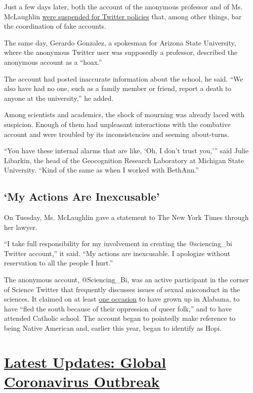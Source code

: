Just a few days later, both the account of the anonymous professor and
of Ms. McLaughlin
\href{https://www.buzzfeednews.com/article/peteraldhous/bethann-mclaughlin-twitter-suspension-fake-covid-death}{were
suspended for Twitter policies} that, among other things, bar the
coordination of fake accounts.

The same day, Gerardo Gonzalez, a spokesman for Arizona State
University, where the anonymous Twitter user was supposedly a professor,
described the anonymous account as a ``hoax.''

The account had posted inaccurate information about the school, he said.
``We also have had no one, such as a family member or friend, report a
death to anyone at the university,'' he added.

Among scientists and academics, the shock of mourning was already laced
with suspicion. Enough of them had unpleasant interactions with the
combative account and were troubled by its inconsistencies and seeming
about-turns.

``You have these internal alarms that are like, `Oh, I don't trust
you,''' said Julie Libarkin, the head of the Geocognition Research
Laboratory at Michigan State University. ``Kind of the same as when I
worked with BethAnn.''

\hypertarget{my-actions-are-inexcusable}{%
\subsection{`My Actions Are
Inexcusable'}\label{my-actions-are-inexcusable}}

On Tuesday, Ms. McLaughlin gave a statement to The New York Times
through her lawyer.

``I take full responsibility for my involvement in creating the
@sciencing\_bi Twitter account,'' it said. ``My actions are inexcusable.
I apologize without reservation to all the people I hurt.''

The anonymous account, @Sciencing\_Bi, was an active participant in the
corner of Science Twitter that frequently discusses issues of sexual
misconduct in the sciences. It claimed on at least
\href{https://twitter.com/IsabelOtt/status/1290073135396528129/photo/1}{one
occasion} to have grown up in Alabama, to have ``fled the south because
of their oppression of queer folk,'' and to have attended Catholic
school. The account began to pointedly make reference to being Native
American and, earlier this year, began to identify as Hopi.

\hypertarget{latest-updates-global-coronavirus-outbreak}{%
\section{\texorpdfstring{\href{https://www.nytimes3xbfgragh.onion/2020/08/04/world/coronavirus-cases.html?action=click\&pgtype=Article\&state=default\&region=MAIN_CONTENT_1\&context=storylines_live_updates}{Latest
Updates: Global Coronavirus
Outbreak}}{Latest Updates: Global Coronavirus Outbreak}}\label{latest-updates-global-coronavirus-outbreak}}


